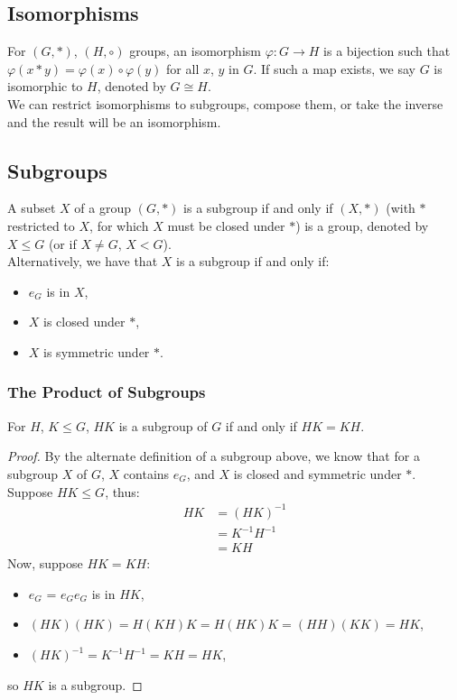 \subsection{Isomorphisms}

For $(G, \ast)$, $(H, \circ)$ groups, an isomorphism $\varphi : G \to H$ is a
bijection such that $\varphi(x \ast y) = \varphi(x) \circ \varphi(y)$ for all
$x$, $y$ in $G$. If such a map exists, we say $G$ is isomorphic to $H$, denoted
by $G \cong H$.
\\[\baselineskip]
We can restrict isomorphisms to subgroups, compose them, or take the inverse
and the result will be an isomorphism.

\subsection{Subgroups}

A subset $X$ of a group $(G, \ast)$ is a subgroup if and only if $(X, \ast)$
(with $\ast$ restricted to $X$, for which $X$ must be closed under $\ast$) 
is a group, denoted by $X \leq G$ (or if $X \neq G$, $X < G$).
\\[\baselineskip]
Alternatively, we have that $X$ is a subgroup if and only if: \begin{itemize}
    \item $e_G$ is in $X$,
    \item $X$ is closed under $\ast$,
    \item $X$ is symmetric under $\ast$.
\end{itemize}

\subsubsection{The Product of Subgroups}

For $H$, $K \leq G$, $HK$ is a subgroup of $G$ if and only if $HK = KH$.

\begin{proof}
    By the alternate definition of a subgroup above, we know that for a subgroup
    $X$ of $G$, $X$ contains $e_G$, and $X$ is closed and symmetric under $\ast$.
    \\[\baselineskip]
    Suppose $HK \leq G$, thus: \begin{align*}
        HK &= (HK)^{-1} \\
        &= K^{-1}H^{-1} \\
        &= KH
    \end{align*} Now, suppose $HK = KH$: \begin{itemize}
        \item $e_G$ = $e_Ge_G$ is in $HK$,
        \item $(HK)(HK) = H(KH)K = H(HK)K = (HH)(KK) = HK$,
        \item $(HK)^{-1} = K^{-1}H^{-1} = KH = HK$,
    \end{itemize} so $HK$ is a subgroup.
\end{proof}

